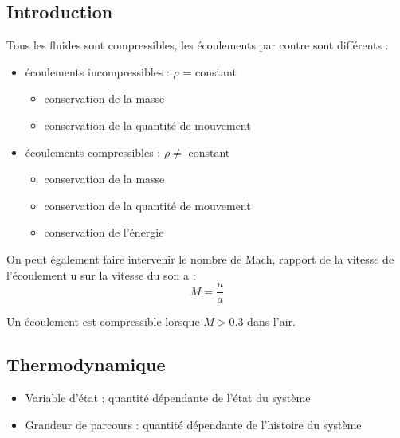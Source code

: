 \documentclass[../main.tex]{subfiles}
\begin{document}
\localtableofcontents

\subsection{Introduction}
Tous les fluides sont compressibles, les écoulements par contre sont différents : \begin{itemize}
    \item écoulements incompressibles : $\rho$ = constant \begin{itemize}
        \item conservation de la masse\\
        \item conservation de la quantité de mouvement\\
    \end{itemize}
    \item écoulements compressibles : $\rho \neq$ constant \begin{itemize}
        \item conservation de la masse\\
        \item conservation de la quantité de mouvement\\
        \item conservation de l'énergie\\
    \end{itemize}
\end{itemize}

On peut également faire intervenir le nombre de Mach, rapport de la vitesse de l'écoulement u sur la vitesse du son a : \begin{equation}
    M = \frac{u}{a}
\end{equation}

Un écoulement est compressible lorsque $M>0.3$ dans l'air.\\

\subsection{Thermodynamique}
\begin{itemize}
    \item Variable d'état : quantité dépendante de l'état du système\\
    \item Grandeur de parcours : quantité dépendante de l'histoire du système\\
\end{itemize}
\end{document}
